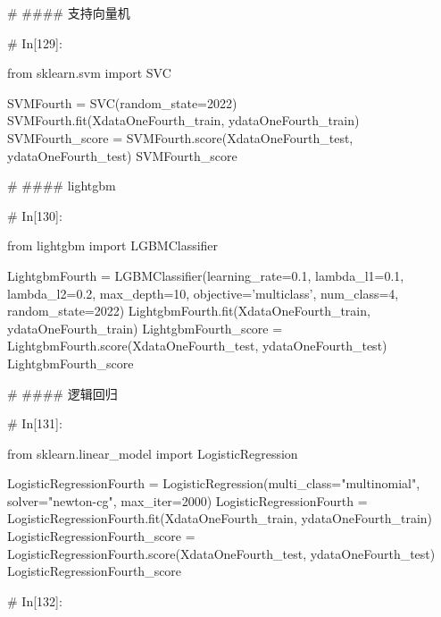 \documentclass{MathorCupmodeling}
\begin{document}
\begin{python}
	# #### 支持向量机
	
	# In[129]:
	
	
	from sklearn.svm import SVC
	
	SVMFourth = SVC(random_state=2022)
	SVMFourth.fit(XdataOneFourth_train, ydataOneFourth_train)
	SVMFourth_score = SVMFourth.score(XdataOneFourth_test, ydataOneFourth_test)
	SVMFourth_score
	
	# #### lightgbm
	
	# In[130]:
	
	
	from lightgbm import LGBMClassifier
	
	LightgbmFourth = LGBMClassifier(learning_rate=0.1,
									lambda_l1=0.1,
									lambda_l2=0.2,
									max_depth=10,
									objective='multiclass',
									num_class=4,
									random_state=2022)
	LightgbmFourth.fit(XdataOneFourth_train, ydataOneFourth_train)
	LightgbmFourth_score = LightgbmFourth.score(XdataOneFourth_test, ydataOneFourth_test)
	LightgbmFourth_score
	
	# #### 逻辑回归
	
	# In[131]:
	
	
	from sklearn.linear_model import LogisticRegression
	
	LogisticRegressionFourth = LogisticRegression(multi_class="multinomial", solver="newton-cg", max_iter=2000)
	LogisticRegressionFourth = LogisticRegressionFourth.fit(XdataOneFourth_train, ydataOneFourth_train)
	LogisticRegressionFourth_score = LogisticRegressionFourth.score(XdataOneFourth_test, ydataOneFourth_test)
	LogisticRegressionFourth_score
	
	# In[132]:
	

\end{python}
\end{document}
